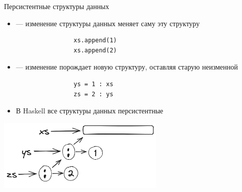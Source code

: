     \begin{frame}[fragile]{Персистентные структуры данных}
        \begin{itemize}
            \item[\defi]  --- изменение структуры данных меняет саму эту структуру
            \begin{verbatim}
                xs.append(1)
                xs.append(2)
            \end{verbatim}
            \item[\defi]  --- изменение порождает новую структуру, оставляя старую неизменной
            \begin{verbatim}
                ys = 1 : xs
                zs = 2 : ys
            \end{verbatim}
            \item[\NB] В Haskell все структуры данных персистентные
        \end{itemize}
        \begin{center}
            \includegraphics[width=0.6\textwidth]{figs/persistent-list}
        \end{center}
    \end{frame}


